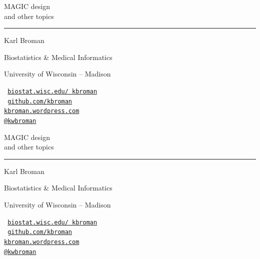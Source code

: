 \documentclass[12pt]{article}
\newcommand{\titlesize}{\fontsize{40}{50} \selectfont}
\newcommand{\headsize}{\fontsize{35}{35} \selectfont}
\newcommand{\smallsize}{\fontsize{25}{30} \selectfont}
\newcommand{\smallersize}{\fontsize{20}{25} \selectfont}
\begin{document}
\thispagestyle{empty}

\begin{center}
\titlesize \color{myyellow}

\vspace*{15mm}

{\headsize MAGIC design} \\
{\smallsize \color{myblue} and other topics}

\vspace*{5mm}

\color{mypink}
\rule{10in}{1mm}

\vspace*{20mm}

\smallsize
\color{white}
Karl Broman
\vspace{5mm}

\color{myblue}
{\smallersize Biostatistics \& Medical Informatics

University of Wisconsin -- Madison
\vspace{10mm}

\tt
\href{http://biostat.wisc.edu/~kbroman}{biostat.wisc.edu/~kbroman} \\
{\color{mybgcolor} \href{http://github.com/kbroman}{github.com/kbroman} \\
\href{http://kbroman.wordpress.com}{kbroman.wordpress.com} \\
\href{http://twitter.com/kwbroman}{@kwbroman} }
}

\end{center}


\newpage
\addtocounter{page}{-1}

\thispagestyle{empty}

\begin{center}
\titlesize \color{myyellow}

\vspace*{15mm}

{\headsize MAGIC design} \\
{\smallsize \color{myblue} and other topics}

\vspace*{5mm}

\color{mypink}
\rule{10in}{1mm}

\vspace*{20mm}

\smallsize
\color{white}
Karl Broman
\vspace{5mm}

\color{myblue}
{\smallersize Biostatistics \& Medical Informatics

University of Wisconsin -- Madison
\vspace{10mm}

\tt
\href{http://biostat.wisc.edu/~kbroman}{biostat.wisc.edu/~kbroman} \\
{\color{myblue} \href{http://github.com/kbroman}{github.com/kbroman} \\
\href{http://kbroman.wordpress.com}{kbroman.wordpress.com} \\
\href{http://twitter.com/kwbroman}{@kwbroman} }
}

\end{center}
\end{document}
